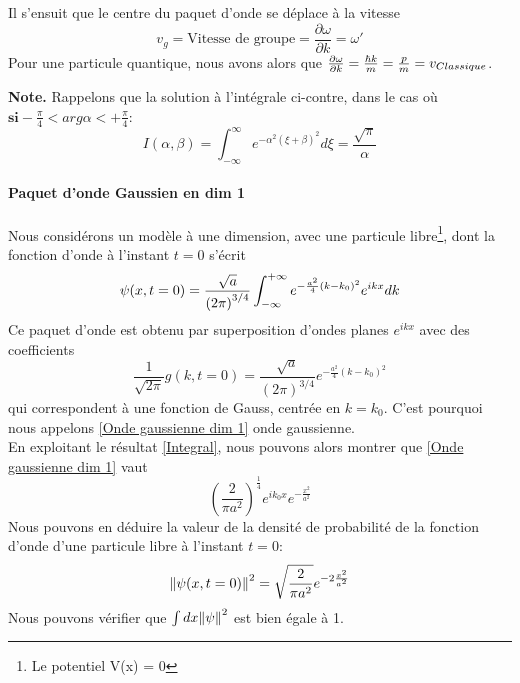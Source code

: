 \documentclass[../notesdecours]{subfiles}
\begin{document}
Il s'ensuit que le centre du paquet d'onde se déplace à la vitesse 
\begin{equation}
v_g = \text{Vitesse de groupe} = \frac{\partial \omega}{\partial k} = \omega'
\end{equation}
Pour une particule quantique, nous avons alors que $\frac{\partial \omega}{\partial k} = \frac{\hbar k}{m} = \frac{p}{m} = v_{Classique}$.

\textbf{Note.} Rappelons que la solution à l'intégrale ci-contre, dans le cas où $\textbf{si} -\frac{\pi}{4} < arg \alpha < + \frac{\pi}{4}$:
\begin{equation}
I(\alpha,\beta) =\int_{-\infty}^{\infty} e^{-\alpha^2 \left(\xi+\beta\right)^2} d\xi = \frac{\sqrt{\pi}}{\alpha}
\label{Integral}
\end{equation}

\paragraph{Paquet d'onde Gaussien en dim 1}
Nous considérons un modèle à une dimension, avec une particule libre\footnote{Le potentiel V(x) = 0}, dont la fonction d'onde à l'instant $t = 0$ s'écrit
\begin{equation}
\psi(x,t=0) = \frac{\sqrt{a}}{\left(2\pi\right)^{3/4}} \int_{-\infty}^{+\infty} e^{- \frac{a^2}{4} (k-k_0)^2} e^{ikx} dk\\
\label{Onde gaussienne dim 1}
\end{equation}
Ce paquet d'onde est obtenu par superposition d'ondes planes $e^{ikx}$ avec des coefficients 
\begin{equation}
\frac{1}{\sqrt{2\pi}} g(k,t=0) = \frac{\sqrt{a}}{\left(2\pi\right)^{3/4}} e^{-\frac{a^2}{4}(k-k_0)^2}
\end{equation}
qui correspondent à une fonction de Gauss, centrée en $k = k_0$. C'est pourquoi nous appelons \eqref{Onde gaussienne dim 1} onde gaussienne.\\

En exploitant le résultat \eqref{Integral}, nous pouvons alors montrer que \ref{Onde gaussienne dim 1} vaut
\begin{equation}
\left( \frac{2}{\pi a^2}\right)^{\frac{1}{4}} e^{ik_0x}e^{- \frac{x^2}{a^2}}
\end{equation}
Nous pouvons en déduire la valeur de la densité de probabilité de la fonction d'onde d'une particule libre à l'instant $t = 0$:
\begin{equation}
\norm{\psi(x,t=0)}^2 = \sqrt{\frac{2}{\pi a^2}} e^{-2 \frac{x^2}{a^2}}
\end{equation}
Nous pouvons vérifier que $\int dx \norm{\psi}^2$ est bien égale à 1.\\
\end{document}
